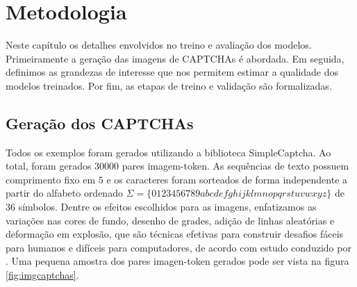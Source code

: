 \chapter{Metodologia} \label{cap:metodologia}

Neste capítulo os detalhes envolvidos no treino e avaliação dos modelos. Primeiramente a geração das imagens de CAPTCHAs é abordada. Em seguida, definimos as grandezas de interesse que nos permitem estimar a qualidade dos modelos treinados. Por fim, as etapas de treino e validação são formalizadas.


\section{Geração dos CAPTCHAs}

Todos os exemplos foram gerados utilizando a biblioteca SimpleCaptcha\cite{simplecaptcha}. Ao total, foram gerados $30000$ pares imagem-token. As sequências de texto possuem comprimento fixo em $5$ e os caracteres foram sorteados de forma independente a partir do alfabeto ordenado $\Sigma = \{0123456789abcdefghijklmnopqrstuvwxyz\}$ de $36$ símbolos. Dentre os efeitos escolhidos para as imagens, enfatizamos as variações nas cores de fundo, desenho de grades, adição de linhas aleatórias e deformação em explosão, que são técnicas efetivas para construir desafios fáceis para humanos e difíceis para computadores, de acordo com estudo conduzido por \cite{lectures2005HIP}. Uma pequena amostra dos pares imagen-token gerados pode ser vista na figura \ref{fig:imgcaptchas}.

